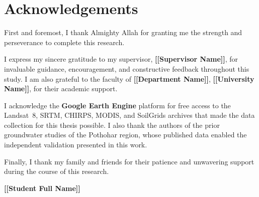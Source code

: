 \chapter*{Acknowledgements}
\thispagestyle{plain}

\noindent
First and foremost, I thank Almighty Allah for granting me the strength and
perseverance to complete this research.

\vspace{0.3cm}
\noindent
I express my sincere gratitude to my supervisor, \textbf{[[Supervisor Name]]},
for invaluable guidance, encouragement, and constructive feedback throughout
this study. I am also grateful to the faculty of \textbf{[[Department Name]]},
\textbf{[[University Name]]}, for their academic support.

\vspace{0.3cm}
\noindent
I acknowledge the \textbf{Google Earth Engine} platform for free access to
the Landsat~8, SRTM, CHIRPS, MODIS, and SoilGrids archives that made the
data collection for this thesis possible. I also thank the authors of the
prior groundwater studies of the Pothohar region, whose published data
enabled the independent validation presented in this work.

\vspace{0.3cm}
\noindent
Finally, I thank my family and friends for their patience and unwavering
support during the course of this research.

\vspace{1cm}
\begin{flushright}
\textbf{[[Student Full Name]]}
\end{flushright}

\cleardoublepage
